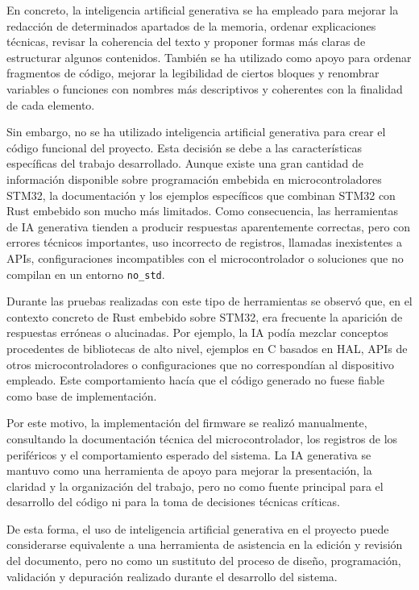 \documentclass[11pt,a4paper]{article}
\begin{document}
En concreto, la inteligencia artificial generativa se ha empleado para mejorar la redacción de determinados apartados de la memoria, ordenar explicaciones técnicas, revisar la coherencia del texto y proponer formas más claras de estructurar algunos contenidos. También se ha utilizado como apoyo para ordenar fragmentos de código, mejorar la legibilidad de ciertos bloques y renombrar variables o funciones con nombres más descriptivos y coherentes con la finalidad de cada elemento.

Sin embargo, no se ha utilizado inteligencia artificial generativa para crear el código funcional del proyecto. Esta decisión se debe a las características específicas del trabajo desarrollado. Aunque existe una gran cantidad de información disponible sobre programación embebida en microcontroladores STM32, la documentación y los ejemplos específicos que combinan STM32 con Rust embebido son mucho más limitados. Como consecuencia, las herramientas de IA generativa tienden a producir respuestas aparentemente correctas, pero con errores técnicos importantes, uso incorrecto de registros, llamadas inexistentes a APIs, configuraciones incompatibles con el microcontrolador o soluciones que no compilan en un entorno \texttt{no\_std}.

Durante las pruebas realizadas con este tipo de herramientas se observó que, en el contexto concreto de Rust embebido sobre STM32, era frecuente la aparición de respuestas erróneas o alucinadas. Por ejemplo, la IA podía mezclar conceptos procedentes de bibliotecas de alto nivel, ejemplos en C basados en HAL, APIs de otros microcontroladores o configuraciones que no correspondían al dispositivo empleado. Este comportamiento hacía que el código generado no fuese fiable como base de implementación.

Por este motivo, la implementación del firmware se realizó manualmente, consultando la documentación técnica del microcontrolador, los registros de los periféricos y el comportamiento esperado del sistema. La IA generativa se mantuvo como una herramienta de apoyo para mejorar la presentación, la claridad y la organización del trabajo, pero no como fuente principal para el desarrollo del código ni para la toma de decisiones técnicas críticas.

De esta forma, el uso de inteligencia artificial generativa en el proyecto puede considerarse equivalente a una herramienta de asistencia en la edición y revisión del documento, pero no como un sustituto del proceso de diseño, programación, validación y depuración realizado durante el desarrollo del sistema.
\end{document}
